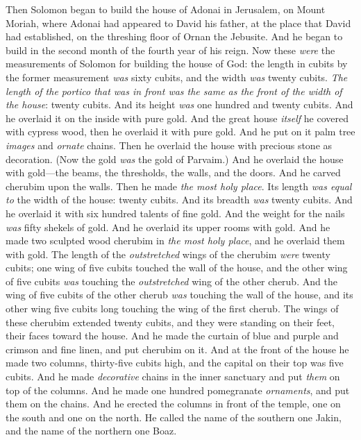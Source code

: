 \begin{biblechapter} %
 Then Solomon began to build the house of Adonai in Jerusalem, on Mount Moriah, where Adonai had appeared to David his father, at the place that David had established, on the threshing floor of Ornan the Jebusite.
\verse And he began to build in the second month of the fourth year of his reign.
\verse Now these \textit{were} the measurements of Solomon for building the house of God: the length in cubits by the former measurement \textit{was} sixty cubits, and the width \textit{was} twenty cubits.
\verse \textit{The length of the portico that \textit{was} in front was the same as the front of the width of the house}: twenty cubits. And its height \textit{was} one hundred and twenty cubits. And he overlaid it on the inside with pure gold.
\verse And the great house \textit{itself} he covered with cypress wood, then he overlaid it with pure gold. And he put on it palm tree \textit{images} and \textit{ornate} chains.
\verse Then he overlaid the house with precious stone as decoration. (Now the gold \textit{was} the gold of Parvaim.)
\verse And he overlaid the house with gold—the beams, the thresholds, the walls, and the doors. And he carved cherubim upon the walls.
\verse Then he made \textit{the most holy place}. Its length \textit{was equal to} the width of the house: twenty cubits. And its breadth \textit{was} twenty cubits. And he overlaid it with six hundred talents of fine gold.
\verse And the weight for the nails \textit{was} fifty shekels of gold. And he overlaid its upper rooms with gold.
\verse And he made two sculpted wood cherubim in \textit{the most holy place}, and he overlaid them with gold.
\verse The length of the \textit{outstretched} wings of the cherubim \textit{were} twenty cubits; one wing of five cubits touched the wall of the house, and the other wing of five cubits \textit{was} touching the \textit{outstretched} wing of the other cherub.
\verse And the wing of five cubits of the other cherub \textit{was} touching the wall of the house, and its other wing five cubits long touching the wing of the first cherub.
\verse The wings of these cherubim extended twenty cubits, and they were standing on their feet, their faces toward the house.
\verse And he made the curtain of blue and purple and crimson and fine linen, and put cherubim on it.
\verse And at the front of the house he made two columns, thirty-five cubits high, and the capital on their top was five cubits.
\verse And he made \textit{decorative} chains in the inner sanctuary and put \textit{them} on top of the columns. And he made one hundred pomegranate \textit{ornaments}, and put them on the chains.
\verse And he erected the columns in front of the temple, one on the south and one on the north. He called the name of the southern one Jakin, and the name of the northern one Boaz.
\end{biblechapter}

